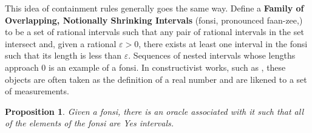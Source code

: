 \documentclass[12pt]{article}
\newtheorem{proposition}{Proposition}[section]
\begin{document}
This idea of containment rules generally goes the same way. Define a \textbf{Family of Overlapping, Notionally Shrinking Intervals} (fonsi, pronounced faan-zee,)  to be a set of rational intervals such that any pair of rational intervals in the set intersect and, given a rational $\varepsilon >0$, there exists at least one interval in the fonsi such that its length is less than $\varepsilon$. Sequences of nested intervals whose lengths approach 0 is an example of a fonsi. In constructivist works, such as \cite{bridger}, these objects are often taken as the definition of a real number and are likened to a set of measurements. 

\begin{proposition}
    Given a fonsi, there is an oracle associated with it such that all of the elements of the fonsi are Yes intervals. 
\end{proposition}
\end{document}
